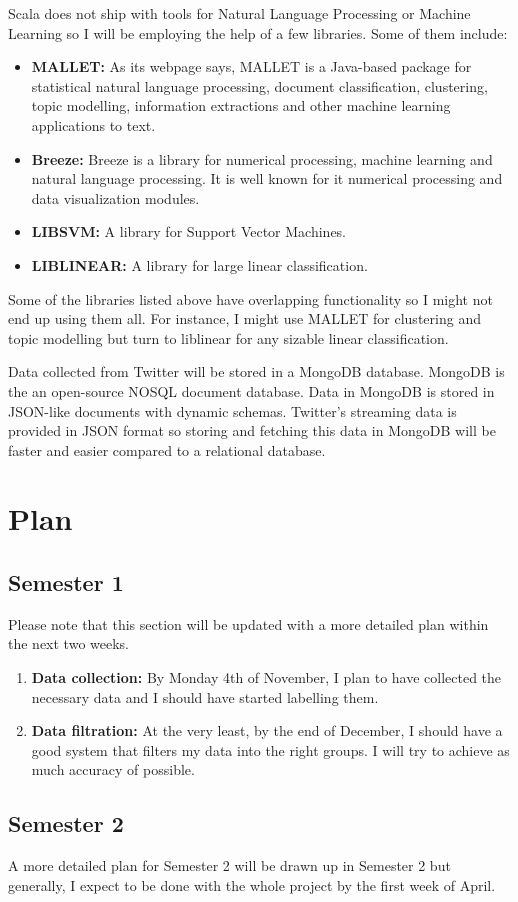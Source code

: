 \documentclass[12pt, a4paper]{article}
\begin{document}
Scala does not ship with tools for Natural Language Processing or Machine Learning so I will be
employing the help of a few libraries. Some of them include:
\begin{itemize}
  \item \textbf{MALLET:} As its webpage says, MALLET is a Java-based package for statistical natural
    language processing, document classification, clustering, topic modelling, information
    extractions and other machine learning applications to text.
  \item \textbf{Breeze:} Breeze is a library for numerical processing, machine learning and natural
    language processing. It is well known for it numerical processing and data visualization
    modules.
  \item \textbf{LIBSVM:} A library for Support Vector Machines.
  \item \textbf{LIBLINEAR:} A library for large linear classification.
\end{itemize}
Some of the libraries listed above have overlapping functionality so I might not end up using them
all. For instance, I might use MALLET for clustering and topic modelling but turn to liblinear for
any sizable linear classification.

Data collected from Twitter will be stored in a MongoDB database. MongoDB is the an open-source
NOSQL document database. Data in MongoDB is stored in JSON-like documents with dynamic schemas.
Twitter's streaming data is provided in JSON format so storing and fetching this data in MongoDB
will be faster and easier compared to a relational database.


\section{Plan}
\subsection{Semester 1}
Please note that this section will be updated with a more detailed plan within the next two weeks.
\begin{enumerate}
  \item \textbf{Data collection:} By Monday 4th of November, I plan to have collected the necessary
    data and I should have started labelling them.
  \item \textbf{Data filtration:} At the very least, by the end of December, I should have a good
    system that filters my data into the right groups. I will try to achieve as much accuracy of
    possible.

\end{enumerate}

\subsection{Semester 2}
A more detailed plan for Semester 2 will be drawn up in Semester 2 but generally, I expect to be
done with the whole project by the first week of April.
\end{document}
